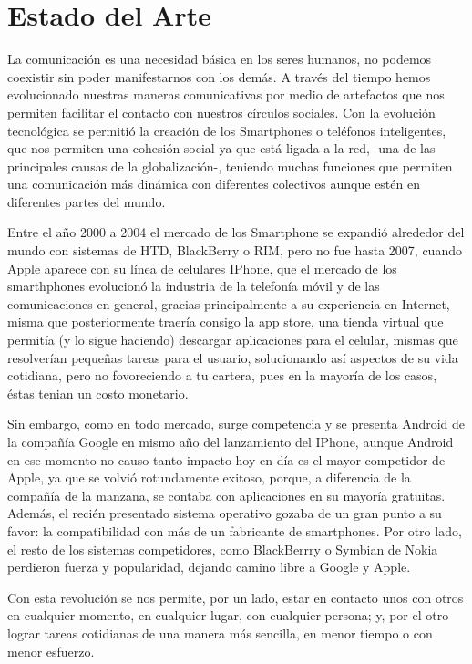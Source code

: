 \section{Estado del Arte}

\noindent
La comunicación es una necesidad básica en los seres humanos, no podemos coexistir sin poder manifestarnos con los demás. A través del tiempo hemos evolucionado nuestras maneras comunicativas por medio de artefactos que nos permiten facilitar el contacto con nuestros círculos sociales. Con la evolución tecnológica se permitió la creación de los Smartphones o teléfonos inteligentes, que nos permiten una cohesión social ya que está ligada a la red, -una de las principales causas de la globalización-, teniendo muchas funciones que permiten una comunicación más dinámica con diferentes colectivos aunque estén en diferentes partes del mundo.

\noindent
\newline
Entre el año 2000 a 2004 el mercado de los Smartphone se expandió alrededor del mundo con sistemas de HTD, BlackBerry o RIM, pero no fue hasta 2007, cuando Apple aparece con su línea de celulares IPhone, que el mercado de los smarthphones evolucionó la industria de la telefonía móvil y de las comunicaciones en general, gracias principalmente a su experiencia en Internet, misma que posteriormente traería consigo la app store, una tienda virtual que permitía (y lo sigue haciendo) descargar aplicaciones para el celular, mismas que resolverían pequeñas tareas para el usuario, solucionando así aspectos de su vida cotidiana, pero no fovoreciendo a tu cartera, pues en la mayoría de los casos, éstas tenian un costo monetario. 

\noindent
Sin embargo, como en todo mercado, surge competencia y se presenta Android de la compañía Google en mismo año del lanzamiento del IPhone, aunque Android en ese momento no causo tanto impacto hoy en día es el mayor competidor de Apple, ya que se volvió rotundamente exitoso, porque, a diferencia de la compañía de la manzana, se contaba con aplicaciones en su mayoría gratuitas. Además, el recién presentado sistema operativo gozaba de un gran punto a su favor: la compatibilidad con más de un fabricante de smartphones. 
Por otro lado, el resto de los sistemas competidores, como BlackBerrry o Symbian de Nokia perdieron fuerza y popularidad, dejando camino libre a Google y Apple.

\noindent
\newline
Con esta revolución se nos permite, por un lado, estar en contacto unos con otros en cualquier momento, en cualquier lugar, con cualquier persona; y, por el otro lograr tareas cotidianas de una manera más sencilla, en menor tiempo o con menor esfuerzo. \cite{Conexion}

